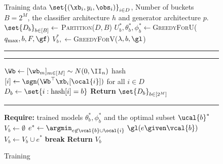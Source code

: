 \documentclass[letterpaper]{article}
\begin{document}
 \begin{figure}[H]
\vspace{-9mm}
\begin{minipage}{0.48\textwidth}
\begin{algorithm}[H]
\small
\caption{Training}
\begin{algorithmic}[1]
    \REQUIRE Training data $\set{(\xb_i,y_i,\obs_i)}_{i\in D}$, Number of buckets $B=2^M$, the classifier architecture $h$ and generator architecture $p$.
        \STATE $\set{D_b}_{b\in[B]}\leftarrow$ \textsc{Partition}($D,B$)
        \STATE $U_b ^*, \theta^* _b , \phi^* _b  \gets $\textsc{GreedyForU}($q_{\max},b, F, \gf)$
        \STATE $V_b ^*, \gets $\textsc{GreedyForV}($\lambda,b, \gl$)
        \ENDFOR

            \end{algorithmic}
\hrule
\hrule
\begin{algorithmic}[1]
        \STATE $\Wb \leftarrow [\wb_m]_{m \in [M]}\sim N(0,\II_{n})$
        \STATE hash$[i]\leftarrow \sgn(\Wb^{\top} \xb_i [\ocal{i}])$ for all $i\in D$
        \STATE $D_b \leftarrow \set{i:\text{hash}[i]=b}$
        \STATE \textbf{Return} $\set{D_b}_{b\in [2^M]}$ 
    \ENDFUNCTION
    \end{algorithmic}

\hrule
\begin{algorithmic}[1]
    \STATE \textbf{Require:} trained models $\theta^* _b, \phi^* _b$ and the optimal subset $\ucal{b}^*$
    \STATE $V_b \leftarrow \emptyset$
         \STATE $e^* \gets  {\argmin}_{e\not\in \vcal{b}\cup \ocal{i}} \ \gl(e  \given \vcal{b} ) $
           \STATE $V_b \gets V_b \cup e^*$ 
           \STATE \textbf{break}
          \ENDIF
         \ENDFOR
        \STATE \textbf{Return} $V_b$
    \ENDFUNCTION

\end{algorithmic}
\label{alg:training}
\end{algorithm}
\end{minipage} \hspace{3mm}
\end{figure}
\end{document}
